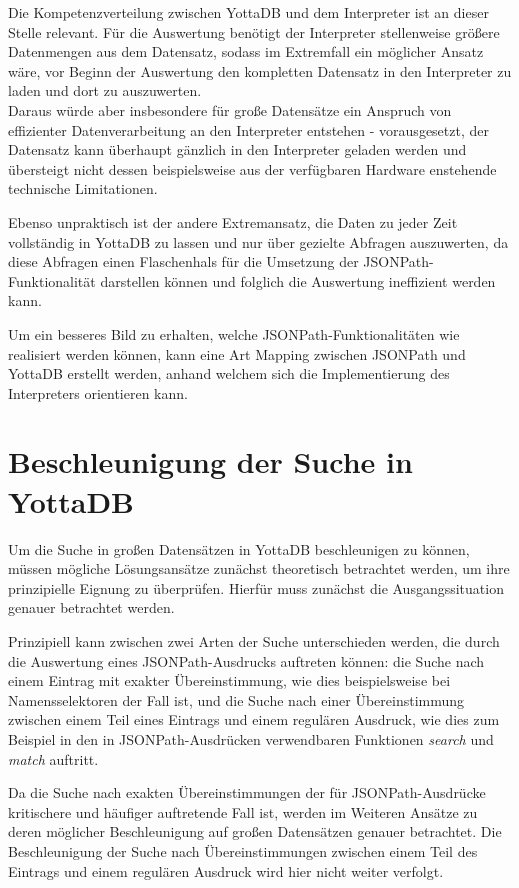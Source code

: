 \documentclass[oneside]{ausarbeitung}
\begin{document}
Die Kompetenzverteilung zwischen YottaDB und dem Interpreter ist an dieser Stelle relevant. Für die Auswertung benötigt der Interpreter stellenweise größere Datenmengen aus dem Datensatz, sodass im Extremfall ein möglicher Ansatz wäre, vor Beginn der Auswertung den kompletten Datensatz in den Interpreter zu laden und dort zu auszuwerten. \\
Daraus würde aber insbesondere für große Datensätze ein Anspruch von effizienter Datenverarbeitung an den Interpreter entstehen - vorausgesetzt, der Datensatz kann überhaupt gänzlich in den Interpreter geladen werden und übersteigt nicht dessen beispielsweise aus der verfügbaren Hardware enstehende technische Limitationen. 

Ebenso unpraktisch ist der andere Extremansatz, die Daten zu jeder Zeit vollständig in YottaDB zu lassen und nur über gezielte Abfragen auszuwerten, da diese Abfragen einen Flaschenhals für die Umsetzung der JSONPath-Funktionalität darstellen können und folglich die Auswertung ineffizient werden kann.

Um ein besseres Bild zu erhalten, welche JSONPath-Funktionalitäten wie realisiert werden können, kann eine Art Mapping zwischen JSONPath und YottaDB erstellt werden, anhand welchem sich die Implementierung des Interpreters orientieren kann.
	
	
	
\section{Beschleunigung der Suche in YottaDB}
	
Um die Suche in großen Datensätzen in YottaDB beschleunigen zu können, müssen mögliche Lösungsansätze zunächst theoretisch betrachtet werden, um ihre prinzipielle Eignung zu überprüfen. Hierfür muss zunächst die Ausgangssituation genauer betrachtet werden.
	
Prinzipiell kann zwischen zwei Arten der Suche unterschieden werden, die durch die Auswertung eines JSONPath-Ausdrucks auftreten können: die Suche nach einem Eintrag mit exakter Übereinstimmung, wie dies beispielsweise bei Namensselektoren der Fall ist, und die Suche nach einer Übereinstimmung zwischen einem Teil eines Eintrags und einem regulären Ausdruck, wie dies zum Beispiel in den in JSONPath-Ausdrücken verwendbaren Funktionen \textit{search} und \textit{match} auftritt. 
	

\pagebreak

Da die Suche nach exakten Übereinstimmungen der für JSONPath-Ausdrücke kritischere und häufiger auftretende Fall ist, werden im Weiteren Ansätze zu deren möglicher Beschleunigung auf großen Datensätzen genauer betrachtet. Die Beschleunigung der Suche nach Übereinstimmungen zwischen einem Teil des Eintrags und einem regulären Ausdruck wird hier nicht weiter verfolgt. 
	
\end{document}
